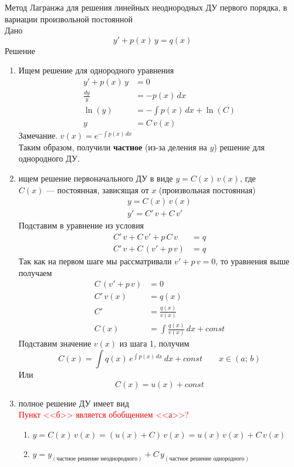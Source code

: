 \begin{Note}
Метод Лагранжа для решения линейных неоднородных ДУ первого порядка, в вариации произвольной постоянной\\
Дано
\[
    y'+p(x)\,y=q(x)
\]
Решение
    \begin{enumerate}
        \item Ищем решение для однородного уравнения
        \begin{align*}
            y'+p(x)\,y&=0\\
            \frac{dy}{y}&=-p(x)\,dx\\
            \ln(y)&=-\int p(x)\,dx+\ln(C)\\
            y&= C\,v(x)
        \end{align*}
        Замечание. $v(x)=e^{-\int p(x)\,dx}$\\
        Таким образом, получили \textbf{частное} (из-за деления на $y$) решение для однородного ДУ.
    
        \item ищем решение первоначального ДУ в виде $y=C(x)\,v(x)$, где\\ $C(x)$ --- постоянная, зависящая от $x$ (произвольная постоянная)
        \begin{align*}
            y = C(x)\,v(x)\\
            y'=C'\,v + C\,v'
        \end{align*}
        Подставим в уравнение из условия
        \begin{align*}  
            C'\,v+C\,v'+p\,C\,v&=q\\ 
            C'\,v+C\,(v'+p\,v)&=q
        \end{align*}
        Так как на первом шаге мы рассматривали $v'+p\,v = 0$, то уравнения выше получаем
        \begin{align*}
            C\,(v'+p\,v)&=0\\
            C'\,v(x) &= q(x)\\
            C'&=\frac{q(x)}{v(x)}\\
            C(x)&=\int \frac{q(x)}{v(x)}\,dx+const
        \end{align*}
        Подставим значение $v(x)$ из шага 1, получим
        \[
            C(x) = \int q(x)\,e^{\int p(x)\,dx}\,dx+const \qquad x \in (a;\,b)
        \]
        Или
        \[
            C(x) = u(x) + const
        \]
        \item полное решение ДУ имеет вид\\
        \textcolor{red}{Пункт <<б>> является обобщением  <<а>>?}
        \begin{enumerate}
            \item $y= C(x)\,v(x) = (u(x) + C)\,v(x)=u(x)\,v(x)+C\,v(x)$
            \item $y=y_{(\text{частное решение неоднородного})} + C\,y_{(\text{частное решение однородного})}$
        \end{enumerate}
    \end{enumerate}
\end{Note}


